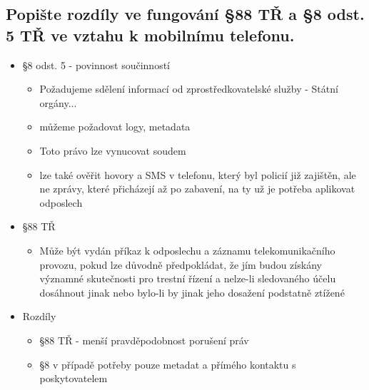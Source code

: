 \subsection{Popište rozdíly ve fungování §88 TŘ a §8 odst. 5 TŘ ve vztahu k mobilnímu telefonu.}
\begin{itemize}
    \item §8 odst. 5 - povinnost součinností
          \begin{itemize}
              \item Požadujeme sdělení informací od zprostředkovatelské služby - Státní orgány...
              \item můžeme požadovat logy, metadata
              \item Toto právo lze vynucovat soudem
              \item lze také ověřit hovory a SMS v telefonu, který byl policií již zajištěn, ale ne zprávy, které přicházejí až po zabavení, na ty už je potřeba aplikovat odposlech\\
          \end{itemize}

    \item §88 TŘ
          \begin{itemize}
              \item Může být vydán příkaz k odposlechu a záznamu telekomunikačního provozu, pokud lze důvodně předpokládat, že jím budou získány významné skutečnosti pro trestní řízení a nelze-li sledovaného účelu dosáhnout jinak nebo bylo-li by jinak jeho dosažení podstatně ztížené
          \end{itemize}
    \item Rozdíly
          \begin{itemize}
              \item §88 TŘ - menší pravděpodobnost porušení práv
              \item §8 v případě potřeby pouze metadat a přímého kontaktu s poskytovatelem
          \end{itemize}
\end{itemize}


